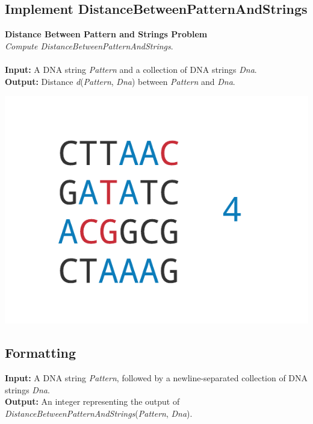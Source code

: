 \documentclass{article}
\begin{document}
\subsection{Implement DistanceBetweenPatternAndStrings}
\hline\vspace{5}
\noindent\textbf{Distance Between Pattern and Strings Problem}\\
\emph{Compute DistanceBetweenPatternAndStrings}.\\ \\
\noindent\textbf{Input:} A DNA string \emph{Pattern} and a collection of DNA strings \emph{Dna}.\\
\noindent\textbf{Output:} Distance \emph{d}(\emph{Pattern}, \emph{Dna}) between \emph{Pattern} and \emph{Dna}.
\begin{center}
    \includegraphics[scale=0.2]{c2/logos/2H.png} 
\end{center}
\hline\vspace{5}

\subsection*{Formatting}
\noindent\textbf{Input:} A DNA string \emph{Pattern}, followed by a newline-separated collection of DNA strings \emph{Dna}.\\
\noindent\textbf{Output:} An integer representing the output of \emph{DistanceBetweenPatternAndStrings}(\emph{Pattern}, \emph{Dna}).
\end{document}
